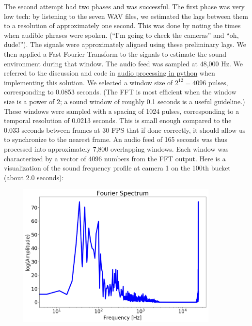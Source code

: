 \documentclass{article}
\begin{document}
The second attempt had two phases and was successful.  The first phase was very low tech:
by listening to the seven WAV files, we estimated the lags between them to a resolution of approximately one second.
This was done by noting the times when audible phrases were spoken.  
(``I'm going to check the cameras'' and ``oh, dude!'').
The signals were approximately aligned using these preliminary lags.
We then applied a Fast Fourier Transform to the signals to estimate the sound environment during that window.
The audio feed was sampled at 48,000 Hz.  
We referred to the discussion and code in 
\href{https://engineersportal.com/blog/2018/9/13/audio-processing-in-python-part-i-sampling-and-the-fast-fourier-transform}{audio processing in python}
when implementing this solution.
We selected a window size of $2^{12} = 4096$ pulses, corresponding to 0.0853 seconds.
(The FFT is most efficient when the window size is a power of 2; a sound window of roughly 0.1 seconds is a useful guideline.)
These windows were sampled with a spacing of 1024 pulses, corresponding to a temporal resolution of 0.0213 seconds. 
This is small enough compared to the 0.033 seconds between frames at 30 FPS that if done correctly,
it should allow us to synchronize to the nearest frame.  
An audio feed of 165 seconds was thus processed into approximately 7,800 overlapping windows.
Each window was characterized by a vector of 4096 numbers from the FFT output.
Here is a visualization of the sound frequency profile at camera 1 on the 100th bucket (about 2.0 seconds):
\begin{figure}[H]
\center
\includegraphics[width=0.90\textwidth]{fourier_spectrum.png}
\end{figure}
\end{document}
